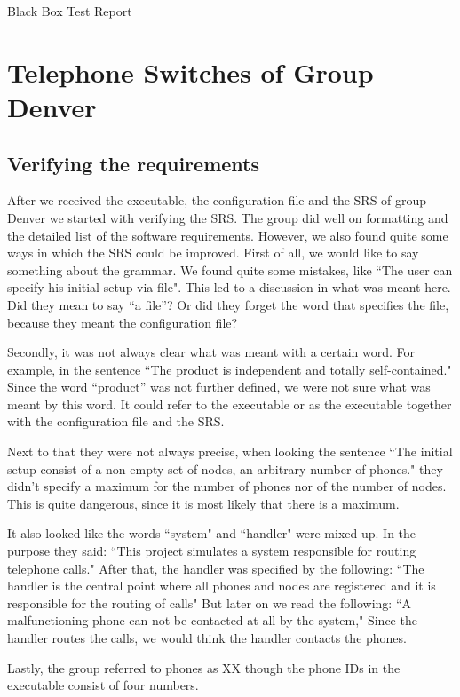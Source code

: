 \documentclass{article}
\begin{document}
\begin{center}
\huge
Black Box Test Report
\end{center}

\section{Telephone Switches of Group Denver}
\subsection{Verifying the requirements}
After we received the executable, the configuration file and the SRS of group Denver we started with verifying the SRS. The group did well on formatting and the detailed list of the software requirements. However, we also found quite some ways in which the SRS could be improved.
First of all, we would like to say something about the grammar. We found quite some mistakes, like ``The user can specify his initial setup via file". This led to a discussion in what was meant here. Did they mean to say ``a file''? Or did they forget the word that specifies the file, because they meant the configuration file? 

Secondly, it was not always clear what was meant with a certain word. For example, in the sentence ``The product is independent and totally self-contained." Since the word ``product'' was not further defined, we were not sure what was meant by this word. It could refer to the executable or as the executable together with the configuration file and the SRS. 

Next to that they were not always precise, when looking the sentence ``The initial setup consist of a non empty set of nodes, an arbitrary number of phones." they didn't specify a maximum for the number of phones nor of the number of nodes. This is quite dangerous, since it is most likely that there is a maximum.  

It also looked like the words ``system" and ``handler" were mixed up. In the purpose they said: ``This project simulates a system responsible for routing telephone calls." After that, the handler was specified by the following: ``The handler is the central point where all phones and nodes are registered and it is responsible for the routing of calls" But later on we read the following: ``A malfunctioning phone can not be contacted at all by the system," Since the handler routes the calls, we would think the handler contacts the phones. 

Lastly, the group referred to phones as XX though the phone IDs in the executable consist of four numbers. 
\end{document}
